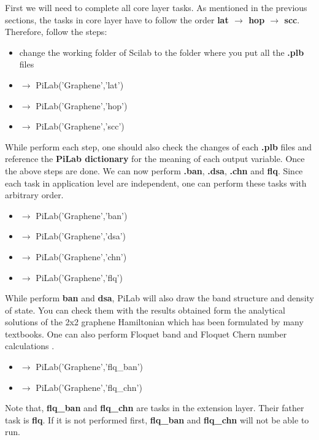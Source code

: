 \documentclass[10pt,a4paper]{article}
\begin{document}
First we will need to complete all core layer tasks. As mentioned in the previous sections, the tasks in core layer have to follow the order \textbf{lat $\rightarrow$ hop $\rightarrow$ scc}. Therefore, follow the steps:
\begin{itemize}
\item change the working folder of Scilab to the folder where you put all the \textbf{.plb} files
\item $\rightarrow$ PiLab('Graphene','lat')
\item $\rightarrow$ PiLab('Graphene','hop')
\item $\rightarrow$ PiLab('Graphene','scc')
\end{itemize}
While perform each step, one should also check the changes of each \textbf{.plb} files and reference the \textbf{PiLab dictionary} for the meaning of each output variable. Once the above steps are done. We can now perform \textbf{.ban}, \textbf{.dsa}, \textbf{.chn} and \textbf{flq}. Since each task in application level are independent, one can perform these tasks with arbitrary order.
\begin{itemize}
\item $\rightarrow$ PiLab('Graphene','ban')
\item $\rightarrow$ PiLab('Graphene','dsa')
\item $\rightarrow$ PiLab('Graphene','chn')
\item $\rightarrow$ PiLab('Graphene','flq')
\end{itemize}
While perform \textbf{ban} and \textbf{dsa}, PiLab will also draw the band structure and density of state. You can check them with the results obtained form  the analytical solutions of the 2x2 graphene Hamiltonian which has been formulated by many textbooks. One can also perform Floquet band and Floquet Chern number calculations . 
\begin{itemize}
\item $\rightarrow$ PiLab('Graphene','flq\_ban')
\item $\rightarrow$ PiLab('Graphene','flq\_chn')
\end{itemize}
Note that, \textbf{flq\_ban} and \textbf{flq\_chn} are tasks in the extension layer. Their father task is \textbf{flq}. If it is not performed first, \textbf{flq\_ban} and \textbf{flq\_chn} will not be able to run.   
\end{document}
